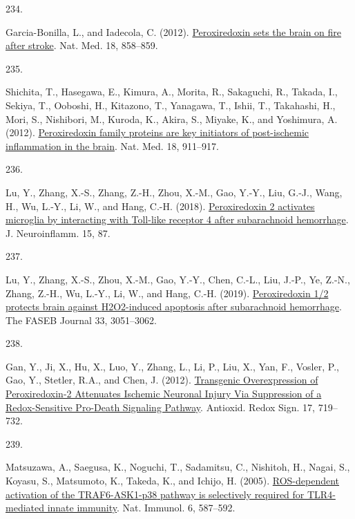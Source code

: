 \documentclass[
]{article}
\newlength{\cslhangindent}
\newlength{\csllabelwidth}
\newlength{\cslentryspacingunit} %
\newenvironment{CSLReferences}[2] %
 {%
  \setlength{\parindent}{0pt}
  \ifodd #1
  \let\oldpar\par
  \def\par{\hangindent=\cslhangindent\oldpar}
  \fi
  \setlength{\parskip}{#2\cslentryspacingunit}
 }%
 {}
\newcommand{\CSLLeftMargin}[1]{\parbox[t]{\csllabelwidth}{#1}}
\newcommand{\CSLRightInline}[1]{\parbox[t]{\linewidth - \csllabelwidth}{#1}\break}
\begin{document}
\begin{CSLReferences}{0}{0}
\leavevmode{}%
\CSLLeftMargin{234. }
\CSLRightInline{Garcia-Bonilla, L., and Iadecola, C. (2012). \href{https://doi.org/10.1038/nm.2797}{Peroxiredoxin sets the brain on fire after stroke}. Nat. Med. 18, 858--859.}

\leavevmode{}%
\CSLLeftMargin{235. }
\CSLRightInline{Shichita, T., Hasegawa, E., Kimura, A., Morita, R., Sakaguchi, R., Takada, I., Sekiya, T., Ooboshi, H., Kitazono, T., Yanagawa, T., Ishii, T., Takahashi, H., Mori, S., Nishibori, M., Kuroda, K., Akira, S., Miyake, K., and Yoshimura, A. (2012). \href{https://doi.org/10.1038/nm.2749}{Peroxiredoxin family proteins are key initiators of post-ischemic inflammation in the brain}. Nat. Med. 18, 911--917.}

\leavevmode{}%
\CSLLeftMargin{236. }
\CSLRightInline{Lu, Y., Zhang, X.-S., Zhang, Z.-H., Zhou, X.-M., Gao, Y.-Y., Liu, G.-J., Wang, H., Wu, L.-Y., Li, W., and Hang, C.-H. (2018). \href{https://doi.org/10.1186/s12974-018-1118-4}{Peroxiredoxin 2 activates microglia by interacting with {Toll-like} receptor 4 after subarachnoid hemorrhage}. J. Neuroinflamm. 15, 87.}

\leavevmode{}%
\CSLLeftMargin{237. }
\CSLRightInline{Lu, Y., Zhang, X.-S., Zhou, X.-M., Gao, Y.-Y., Chen, C.-L., Liu, J.-P., Ye, Z.-N., Zhang, Z.-H., Wu, L.-Y., Li, W., and Hang, C.-H. (2019). \href{https://doi.org/10.1096/fj.201801150R}{Peroxiredoxin 1/2 protects brain against {H2O2-induced} apoptosis after subarachnoid hemorrhage}. The FASEB Journal 33, 3051--3062.}

\leavevmode{}%
\CSLLeftMargin{238. }
\CSLRightInline{Gan, Y., Ji, X., Hu, X., Luo, Y., Zhang, L., Li, P., Liu, X., Yan, F., Vosler, P., Gao, Y., Stetler, R.A., and Chen, J. (2012). \href{https://doi.org/10.1089/ars.2011.4298}{Transgenic {Overexpression} of {Peroxiredoxin-2 Attenuates Ischemic Neuronal Injury Via Suppression} of a {Redox-Sensitive Pro-Death Signaling Pathway}}. Antioxid. Redox Sign. 17, 719--732.}

\leavevmode{}%
\CSLLeftMargin{239. }
\CSLRightInline{Matsuzawa, A., Saegusa, K., Noguchi, T., Sadamitsu, C., Nishitoh, H., Nagai, S., Koyasu, S., Matsumoto, K., Takeda, K., and Ichijo, H. (2005). \href{https://doi.org/10.1038/ni1200}{{ROS-dependent} activation of the {TRAF6-ASK1-p38} pathway is selectively required for {TLR4-mediated} innate immunity}. Nat. Immunol. 6, 587--592.}


\end{CSLReferences}
\end{document}
